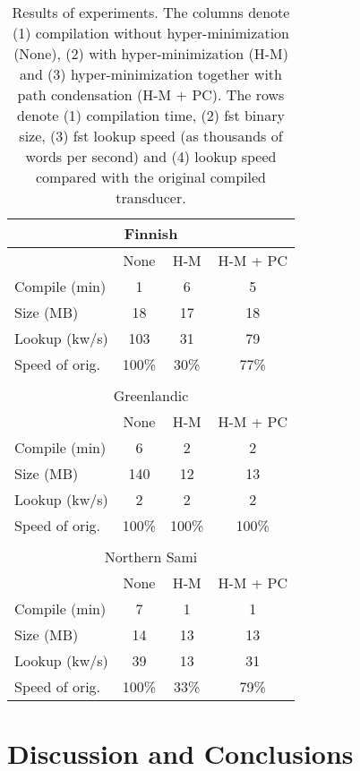 \documentclass[11pt]{article}
\begin{document}
\begin{center}
\begin{table}[!htb]
\begin{tabular}{lccc}
\multicolumn{4}{c}{{\sc Finnish}}\\
\hline
               & None & H-M  & H-M + PC \\
\hline
Compile (min)  &    1 &    6 &    5        \\
Size (MB)      &   18 &   17 &   18        \\
Lookup (kw/s)  &  103 &   31 &   79        \\
Speed of orig. &  100\% & 30\% & 77\% \\
\hline & & & \\
\multicolumn{4}{c}{{\sc Greenlandic}}\\
\hline
               & None & H-M  & H-M + PC \\
\hline
Compile (min)  &    6 &    2 &    2        \\
Size (MB)      &  140 &   12 &   13        \\
Lookup (kw/s)  &    2 &    2 &    2        \\
Speed of orig. &  100\% & 100\% & 100\% \\
\hline & & & \\
\multicolumn{4}{c}{{\sc Northern Sami}}\\
\hline
               & None & H-M  & H-M + PC \\
\hline
Compile (min)  &    7 &    1 &    1        \\
Size (MB)      &   14 &   13 &   13        \\
Lookup (kw/s)  &   39 &   13 &   31        \\
Speed of orig. &  100\% & 33\% & 79\% \\
\hline
\end{tabular}
\caption{Results of experiments. The columns denote (1) compilation without hyper-minimization (None), (2) with hyper-minimization (H-M) and (3) hyper-minimization together with path condensation (H-M + PC). The rows denote (1) compilation time, (2) fst binary size, (3) fst lookup speed (as thousands of words per second) and (4) lookup speed compared with the original compiled transducer.}\label{tab:res}
\end{table}
\end{center}

\section{Discussion and Conclusions}\label{sec:discussion-and-conclusions}
\end{document}
